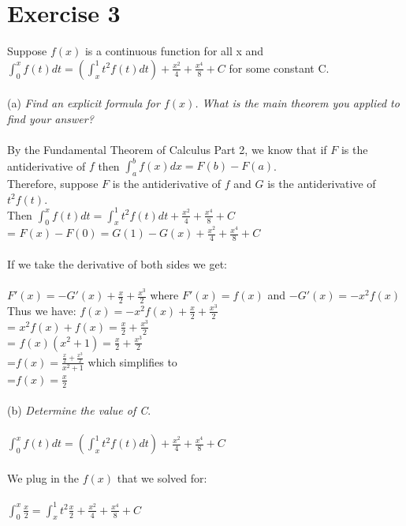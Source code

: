 \documentclass[12pt]{article}
\begin{document}
\section{Exercise 3}
Suppose $f(x)$ is a continuous function for all x and $\int_{0}^{x}f(t)dt = (\int_{x}^{1}t^2f(t)dt) + \frac{x^2}{4}+\frac{x^4}{8}+C$ for some constant C. \\~\\
(a) \textit{Find an explicit formula for $f(x)$. What is the main theorem you applied to find your answer?}\\~\\
By the Fundamental Theorem of Calculus Part 2, we know that if $F$ is the antiderivative of $f$ then $\int_{a}^{b}f(x)dx = F(b) - F(a)$. \\
Therefore, suppose $F$ is the antiderivative of $f$ and $G$ is the antiderivative of $t^2f(t)$. \\
Then $\int_{0}^{x}f(t)dt = \int_{x}^{1}t^2f(t)dt + \frac{x^2}{4} + \frac{x^4}{8}+C$\\
= $F(x) - F(0) = G(1) - G(x) + \frac{x^2}{4} + \frac{x^4}{8}+C$ \\~\\
If we take the derivative of both sides we get:\\~\\
$F'(x) = -G'(x) + \frac{x}{2} + \frac{x^3}{2}$ where $F'(x) = f(x)$ and $-G'(x) = -x^2f(x)$\\
Thus we have: $f(x) = -x^2f(x) + \frac{x}{2} + \frac{x^3}{2}$\\
= $x^2f(x) + f(x) = \frac{x}{2} + \frac{x^3}{2}$\\
= $f(x)(x^2+1) = \frac{x}{2} + \frac{x^3}{2}$\\
=$f(x) = \frac{\frac{x}{2} + \frac{x^3}{2}}{x^2+1}$ which simplifies to\\
=$f(x) = \frac{x}{2}$\\~\\
(b) \textit{Determine the value of C}.\\~\\
$\int_{0}^{x}f(t)dt = (\int_{x}^{1}t^2f(t)dt) + \frac{x^2}{4}+\frac{x^4}{8}+C$\\~\\
We plug in the $f(x)$ that we solved for:\\~\\
$\int_{0}^{x}\frac{x}{2} = \int_{x}^{1}t^2\frac{x}{2} + \frac{x^2}{4}+\frac{x^4}{8}+C$\\~\\
\end{document}
